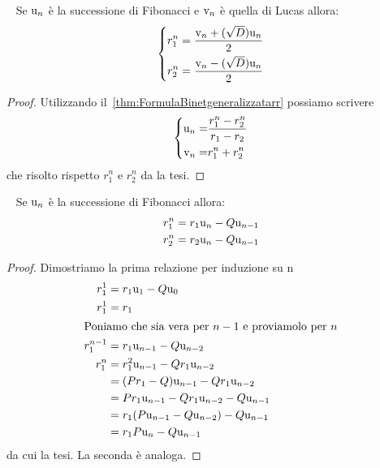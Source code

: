 \begin{thm}~\cite{Rabinowitz_1996}\label{thm:FibLucRimuovirr}
	Se $\mathrm{u}_{n}$ è la successione di Fibonacci e  $\mathrm{v}_{n}$ è quella di Lucas 
	allora:\begin{equation}
		\left\{\begin{aligned}
			r_1^n={}&\dfrac{\mathrm{v}_{n}+(\sqrt{D})\mathrm{u}_{n}}{2}\\
			r_2^n={}&\dfrac{\mathrm{v}_{n}-(\sqrt{D})\mathrm{u}_{n}}{2}\\
		\end{aligned}
		\right.
	\end{equation}
\end{thm}
\begin{proof}
	Utilizzando il~\vref{thm:FormulaBinetgeneralizzatarr} 
	possiamo scrivere
	\begin{equation*}
		\left\{
		\begin{aligned}
			\mathrm{u}_{n}=&\dfrac{r_{1}^n-r_{2}^n}{r_{1}-r_{2}}\\
			\mathrm{v}_{n}=&r_{1}^n+r_{2}^n
		\end{aligned}
		\right.
	\end{equation*}
	che risolto rispetto $r_1^n$ e $r_2^n$ da la tesi.
\end{proof}
\begin{thm}~\cite{Rabinowitz_1996}\label{thm:FibLucRimuovirrpotenze}
	Se $\mathrm{u}_{n}$ è la successione di Fibonacci 
	allora:
		\begin{align}
		r_1^n={}&r_1\mathrm{u}_{n}-Q\mathrm{u}_{n-1}\\
		r_2^n={}&r_2\mathrm{u}_{n}-Q\mathrm{u}_{n-1}\\
		\end{align}
\end{thm}
\begin{proof}
	Dimostriamo la prima relazione per induzione su n
	\begin{align*}
	r_1^1={}&r_1\mathrm{u}_{1}-Q\mathrm{u}_{0}\\
	r_1^1={}&r_1\\
	\intertext{Poniamo che sia vera per $n-1$ e proviamolo per $n$}
	r_1^{n-1}={}&r_1\mathrm{u}_{n-1}-Q\mathrm{u}_{n-2}\\
	r_1^{n}={}&r_1^2\mathrm{u}_{n-1}-Qr_1\mathrm{u}_{n-2}\\
	={}&(Pr_1-Q)\mathrm{u}_{n-1}-Qr_1\mathrm{u}_{n-2}\\
	={}&Pr_1\mathrm{u}_{n-1}-Qr_1\mathrm{u}_{n-2}-Q\mathrm{u}_{n-1}\\
	={}&r_1(P\mathrm{u}_{n-1}-Q\mathrm{u}_{n-2})-Q\mathrm{u}_{n-1}\\
	={}&r_1P\mathrm{u}_{n}-Q\mathrm{u}_{n-1}\\
	\end{align*}
da cui la tesi. La seconda è analoga.
\end{proof}
